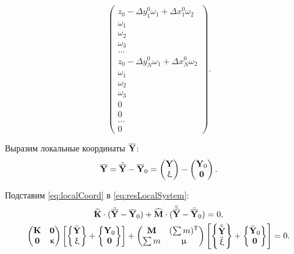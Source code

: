 \begin{equation*}
\begin{pmatrix}
		z_0 -\Delta y_1^0 \omega_1 + \Delta x_1^0 \omega_2 \\
		\omega_1 \\
		\omega_2	\\
		\omega_3 \\
		\hdots \\
		z_0 -\Delta y_N^0 \omega_1 + \Delta x_N^0 \omega_2 \\
		\omega_1 \\
		\omega_2 \\
		\omega_3 \\
		0 \\
		0 \\
		\hdots \\
		0
	 \end{pmatrix}.
\end{equation*}

Выразим локальные координаты $ \overline{\mathbf{Y}} $:
\begin{equation}
	\overline{\mathbf{Y}} = \tilde{\overline{\mathbf{Y}}} - \overline{\mathbf{Y}}_0 = \begin{pmatrix}	\mathbf{Y} \\ \upxi \end{pmatrix} -
\begin{pmatrix} \mathbf{Y}_0 \\ \mathbf{0} \end{pmatrix}.
	\label{eq:localCoord}
\end{equation}

Подставим \eqref{eq:localCoord} в \eqref{eq:resLocalSystem}:
\begin{gather}
	\widehat{\mathbf{K}} \cdot (\tilde{\overline{\mathbf{Y}}} - \overline{\mathbf{Y}}_0) + \widehat{\mathbf{M}} \cdot  (\ddot{\tilde{\overline{\mathbf{Y}}}} - \ddot{\overline{\mathbf{Y}}}_0) = 0, \\
	\begin{pmatrix}
		\mathbf{K} & \mathbf{0} \\
		\mathbf{0} & \upkappa
	\end{pmatrix}
	\left[
	\begin{Bmatrix}
		\tilde{\mathbf{Y}} \\
		\upxi
	\end{Bmatrix}
	+
	\begin{Bmatrix}
		\mathbf{Y}_0 \\
		\mathbf{0}
	\end{Bmatrix}
	\right]
	+
	\begin{pmatrix}
	\mathbf{M} & (\sum m) ^ \mathsf{T} \\
	\sum m & \upmu
	\end{pmatrix}
	\left[
	\begin{Bmatrix}
		\ddot{\tilde{\mathbf{Y}}} \\
		\ddot{\upxi}
	\end{Bmatrix}
	+
	\begin{Bmatrix}
		\ddot{\mathbf{Y}}_0 \\
		\mathbf{0}
	\end{Bmatrix}
	\right] = 0 \nonumber.
\end{gather}

